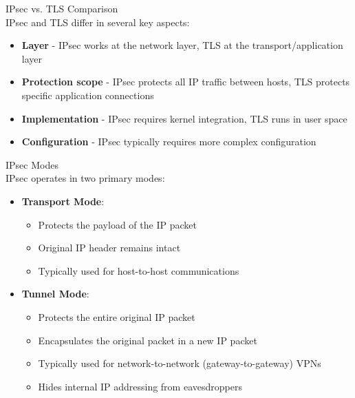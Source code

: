 \begin{theorem}{IPsec vs. TLS Comparison}\\
IPsec and TLS differ in several key aspects:
\begin{itemize}
    \item \textbf{Layer} - IPsec works at the network layer, TLS at the transport/application layer
    \item \textbf{Protection scope} - IPsec protects all IP traffic between hosts, TLS protects specific application connections
    \item \textbf{Implementation} - IPsec requires kernel integration, TLS runs in user space
    \item \textbf{Configuration} - IPsec typically requires more complex configuration
\end{itemize}
\end{theorem}

\begin{concept}{IPsec Modes}\\
IPsec operates in two primary modes:
\begin{itemize}
    \item \textbf{Transport Mode}:
    \begin{itemize}
        \item Protects the payload of the IP packet
        \item Original IP header remains intact
        \item Typically used for host-to-host communications
    \end{itemize}
    \item \textbf{Tunnel Mode}:
    \begin{itemize}
        \item Protects the entire original IP packet
        \item Encapsulates the original packet in a new IP packet
        \item Typically used for network-to-network (gateway-to-gateway) VPNs
        \item Hides internal IP addressing from eavesdroppers
    \end{itemize}
\end{itemize}
\end{concept}

